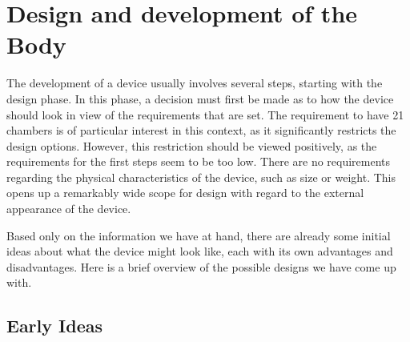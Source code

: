 \section{Design and development of the Body}
The development of a device usually involves several steps, starting with the design phase. In this phase, a decision must first be made as to how the device should look in view of the requirements that are set. The requirement to have 21 chambers is of particular interest in this context, as it significantly restricts the design options. However, this restriction should be viewed positively, as the requirements for the first steps seem to be too low. There are no requirements regarding the physical characteristics of the device, such as size or weight. This opens up a remarkably wide scope for design with regard to the external appearance of the device.

Based only on the information we have at hand, there are already some initial ideas about what the device might look like, each with its own advantages and disadvantages. Here is a brief overview of the possible designs we have come up with.

\subsection{Early Ideas}
